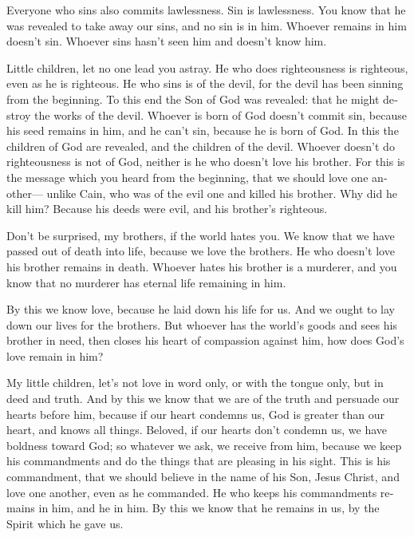 \begin{paracol}{2}
\begin{otherlanguage}{english}
 Everyone who sins also commits lawlessness. Sin is
lawlessness.  You know that he was revealed to take away
our sins, and no sin is in him.  Whoever remains in him
doesn't sin. Whoever sins hasn't seen him and doesn't know him.

 Little children, let no one lead you astray. He who does
righteousness is righteous, even as he is righteous.  He
who sins is of the devil, for the devil has been sinning from the
beginning. To this end the Son of God was revealed: that he might
destroy the works of the devil.  Whoever is born of God
doesn't commit sin, because his seed remains in him, and he can't sin,
because he is born of God.  In this the children of God
are revealed, and the children of the devil. Whoever doesn't do
righteousness is not of God, neither is he who doesn't love his brother.
 For this is the message which you heard from the
beginning, that we should love one another---  unlike
Cain, who was of the evil one and killed his brother. Why did he kill
him? Because his deeds were evil, and his brother's righteous.

 Don't be surprised, my brothers, if the world hates you.
 We know that we have passed out of death into life,
because we love the brothers. He who doesn't love his brother remains in
death.  Whoever hates his brother is a murderer, and you
know that no murderer has eternal life remaining in him.

 By this we know love, because he laid down his life for
us. And we ought to lay down our lives for the brothers. 
But whoever has the world's goods and sees his brother in need, then
closes his heart of compassion against him, how does God's love remain
in him?

 My little children, let's not love in word only, or with
the tongue only, but in deed and truth.  And by this we
know that we are of the truth and persuade our hearts before him,
 because if our heart condemns us, God is greater than
our heart, and knows all things.  Beloved, if our hearts
don't condemn us, we have boldness toward God;  so
whatever we ask, we receive from him, because we keep his commandments
and do the things that are pleasing in his sight.  This
is his commandment, that we should believe in the name of his Son, Jesus
Christ, and love one another, even as he commanded.  He
who keeps his commandments remains in him, and he in him. By this we
know that he remains in us, by the Spirit which he gave us.


\end{otherlanguage}
\end{paracol}
